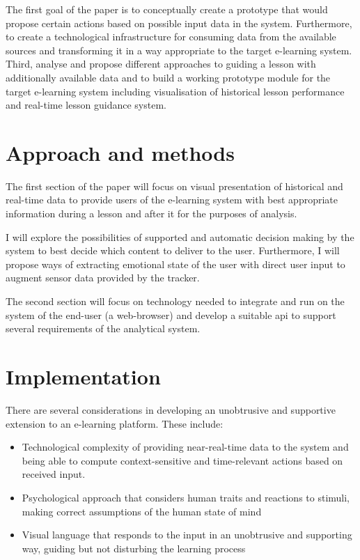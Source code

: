 The first goal of the paper is to conceptually create a prototype that would propose certain actions based on possible input data in the system. Furthermore, to create a technological infrastructure for consuming data from the available sources and transforming it in a way appropriate to the target e-learning system. Third, analyse and propose different approaches to guiding a lesson with additionally available data and to build a working prototype module for the target e-learning system including visualisation of historical lesson performance and real-time lesson guidance system.

\section{Approach and methods}

The first section of the paper will focus on visual presentation of historical and real-time data to provide users of the e-learning system with best appropriate information during a lesson and after it for the purposes of analysis.

I will explore the possibilities of supported and automatic decision making by the system to best decide which content to deliver to the user. Furthermore, I will propose ways of extracting emotional state of the user with direct user input to augment sensor data provided by the tracker.

The second section will focus on technology needed to integrate and run on the system of the end-user (a web-browser) and develop a suitable api to support several requirements of the analytical system.

\section{Implementation}

There are several considerations in developing an unobtrusive and supportive extension to an e-learning platform. These include:

\begin{itemize}
	\item Technological complexity of providing near-real-time data to the system and being able to compute context-sensitive and time-relevant actions based on received input.
	\item Psychological approach that considers human traits and reactions to stimuli, making correct assumptions of the human state of mind
	\item Visual language that responds to the input in an unobtrusive and supporting way, guiding but not disturbing the learning process
\end{itemize}



